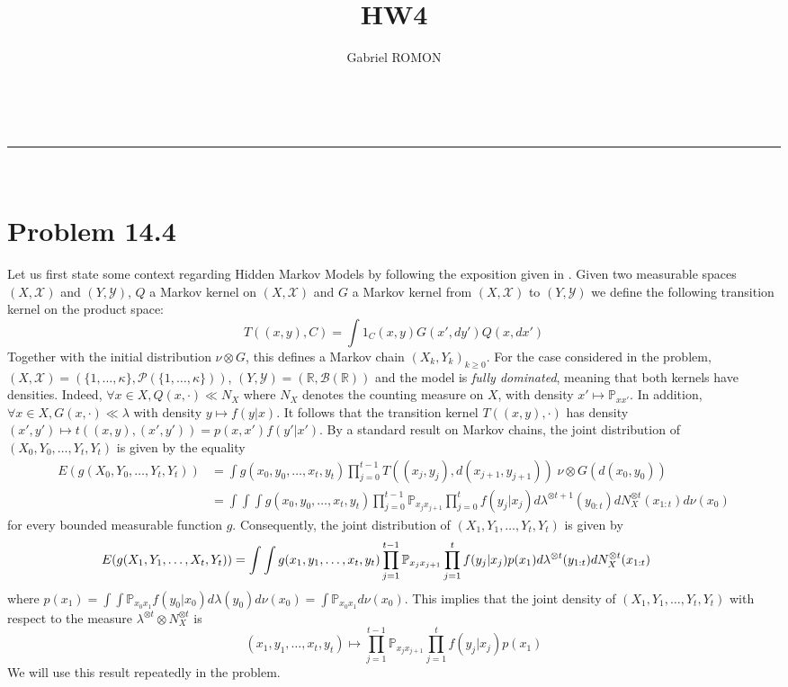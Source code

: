 \documentclass[a4paper,11pt, hidelinks]{article}
\makeatletter
\newcommand{\linia}{\rule{\linewidth}{0.5pt}}
\renewcommand{\maketitle}{
\begin{center}
\vspace{2ex}
{\huge \textsc{\@title}}
\vspace{1ex}
\\
\linia\\
\@author 
\vspace{4ex}
\end{center}
}
\makeatother
\begin{document}
\title{HW4}

\author{Gabriel ROMON}



\maketitle
{}
\section*{Problem 14.4}
Let us first state some context regarding Hidden Markov Models by following the exposition given in \cite{book:54642}. Given two measurable spaces $(X,\mathcal X)$ and $(Y,\mathcal Y)$, $Q$ a Markov kernel on $(X,\mathcal X)$ and $G$ a Markov kernel from $(X,\mathcal X)$ to $(Y,\mathcal Y)$ we define the following transition kernel on the product space: $$T((x,y),C) = \int 1_C(x,y) G(x',dy')Q(x,dx')$$ Together with the initial distribution $\nu \otimes G$, this defines a Markov chain $(X_k,Y_k)_{k\geq 0}$.\newline
For the case considered in the problem, $(X,\mathcal X)=(\{1,\ldots,\kappa\}, \mathcal P(\{1,\ldots,\kappa\}))$, $(Y,\mathcal Y) = (\mathbb R, \mathcal B(\mathbb R))$ and the model is \textit{fully dominated}, meaning that both kernels have densities. Indeed, $\forall x\in X, Q(x,\cdot) \ll N_X$ where $N_X$ denotes the counting measure on $X$, with density $x'\mapsto \mathbb P_{xx'}$. In addition, $\forall x\in X, G(x,\cdot)\ll \lambda$ with density $y\mapsto f(y|x)$. \newline It follows that the transition kernel $T((x,y),\cdot)$ has density $(x',y')\mapsto t((x,y),(x',y'))=p(x,x')f(y'|x')$.\newline
By a standard result on Markov chains, the joint distribution of $(X_0,Y_0,\ldots, Y_t,Y_t)$ is given by the equality $$\begin{aligned}E(g(X_0,Y_0,\ldots, Y_t,Y_t)) 
&= \int g(x_0,y_0,\ldots,x_t,y_t) \prod_{j=0}^{t-1} T((x_{j},y_{j}),d(x_{j+1},y_{j+1})) \;\nu \otimes G(d(x_0,y_0))\\
&= \int \int \int g(x_0,y_0,\ldots,x_t,y_t) \prod_{j=0}^{t-1} \mathbb P_{x_{j} x_{j+1}} \prod_{j=0}^t f(y_j|x_j) d\lambda^{\otimes t+1}(y_{0:t}) dN_X^{\otimes t}(x_{1:t}) d\nu(x_0)
 \end{aligned}$$
for every bounded measurable function $g$. Consequently, the joint distribution of $(X_1,Y_1,\ldots, Y_t,Y_t)$ is given by 
$$\hspace{-1cm}E(g(X_1,Y_1,\ldots, X_t,Y_t)) = \int \int g(x_1,y_1,\ldots,x_t,y_t) \prod_{j=1}^{t-1}\mathbb P_{x_{j} x_{j+1}} \prod_{j=1}^{t}f(y_j|x_j) p(x_1)d\lambda^{\otimes t}(y_{1:t}) dN_X^{\otimes t}(x_{1:t})$$
where $p(x_1) = \int \int \mathbb P_{x_0 x_1} f(y_0|x_0)d\lambda(y_0)d\nu(x_0)=\int \mathbb P_{x_0 x_1} d\nu(x_0)$.\newline
This implies that the joint density of $(X_1,Y_1,\ldots, Y_t,Y_t)$ with respect to the measure $\lambda^{\otimes t} \otimes N_X^{\otimes t}$ is $$(x_1,y_1,\ldots, x_t,y_t) \mapsto \prod_{j=1}^{t-1}\mathbb P_{x_{j} x_{j+1}} \prod_{j=1}^{t}f(y_j|x_j) p(x_1)$$
We will use this result repeatedly in the problem.
\end{document}
